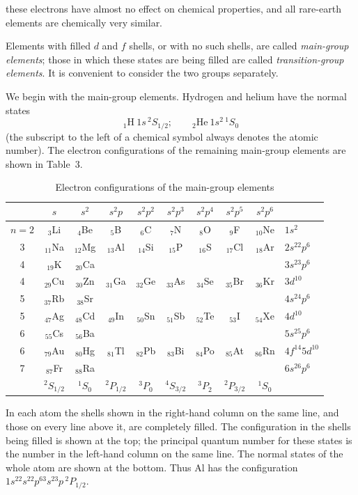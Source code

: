 these electrons have almost no effect on chemical properties, and all rare-earth elements are chemically very similar.

Elements with filled $d$ and $f$ shells, or with no such shells, are called \emph{main-group elements}; those in which these states are being filled are called \emph{transition-group elements}. It is convenient to consider the two groups separately.

We begin with the main-group elements. Hydrogen and helium have the normal states
\[
 {}_1\mathrm H\ 1s\,{}^2S_{1/2};\qquad {}_2\mathrm{He}\ 1s^2\,{}^1S_0
\]
(the subscript to the left of a chemical symbol always denotes the atomic number). The electron configurations of the remaining main-group elements are shown in Table~3.

\begin{table}[ht]
\centering\small
\caption{Electron configurations of the main-group elements}
\begin{tabular}{c|cccccccc|l}
&$s$&$s^2$&$s^2p$&$s^2p^2$&$s^2p^3$&$s^2p^4$&$s^2p^5$&$s^2p^6$&\\\hline
$n=2$&$_3$Li&$_4$Be&$_5$B&$_6$C&$_7$N&$_8$O&$_9$F&$_{10}$Ne&$1s^2$\\
3&$_{11}$Na&$_{12}$Mg&$_{13}$Al&$_{14}$Si&$_{15}$P&$_{16}$S&$_{17}$Cl&$_{18}$Ar&$2s^22p^6$\\
4&$_{19}$K&$_{20}$Ca&&&&&&&$3s^23p^6$\\
4&$_{29}$Cu&$_{30}$Zn&$_{31}$Ga&$_{32}$Ge&$_{33}$As&$_{34}$Se&$_{35}$Br&$_{36}$Kr&$3d^{10}$\\
5&$_{37}$Rb&$_{38}$Sr&&&&&&&$4s^24p^6$\\
5&$_{47}$Ag&$_{48}$Cd&$_{49}$In&$_{50}$Sn&$_{51}$Sb&$_{52}$Te&$_{53}$I&$_{54}$Xe&$4d^{10}$\\
6&$_{55}$Cs&$_{56}$Ba&&&&&&&$5s^25p^6$\\
6&$_{79}$Au&$_{80}$Hg&$_{81}$Tl&$_{82}$Pb&$_{83}$Bi&$_{84}$Po&$_{85}$At&$_{86}$Rn&$4f^{14}5d^{10}$\\
7&$_{87}$Fr&$_{88}$Ra&&&&&&&$6s^26p^6$\\\hline
&$^2S_{1/2}$&$^1S_0$&$^2P_{1/2}$&$^3P_0$&$^4S_{3/2}$&$^3P_2$&$^2P_{3/2}$&$^1S_0$&
\end{tabular}
\end{table}

In each atom the shells shown in the right-hand column on the same line, and those on every line above it, are completely filled. The configuration in the shells being filled is shown at the top; the principal quantum number for these states is the number in the left-hand column on the same line. The normal states of the whole atom are shown at the bottom. Thus Al has the configuration $1s^22s^22p^63s^23p\,{}^2P_{1/2}$.


